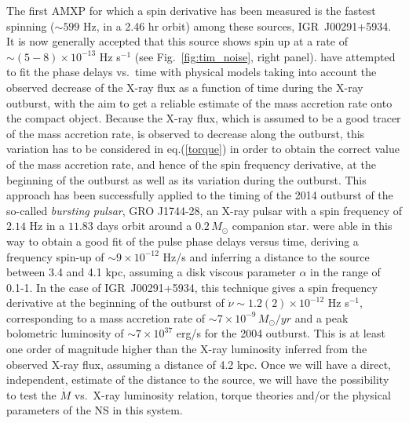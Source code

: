 \documentclass[graybox]{svmult}
\begin{document}
The first AMXP for which a spin derivative has been measured is the fastest spinning ($\sim 599$ Hz, in a 2.46 hr orbit) among these sources, IGR~J00291+5934. It is now generally accepted that this source shows spin up at a rate of $\sim (5-8) \times 10^{-13}$ Hz s$^{-1}$ \cite{Falanga2005b,Patruno2010,Hartman2011,Papitto2011c} (see Fig.~\ref{fig:tim_noise}, right panel). \cite{Burderi2007} have attempted to fit the phase delays vs.\ time with physical models taking into account the observed decrease of the X-ray flux as a function of time during the X-ray outburst, with the aim to get a reliable estimate of the mass accretion rate onto the compact object. 
Because the X-ray flux, which is assumed to be a good tracer of the mass accretion rate, is observed to decrease along the outburst, this variation has to be considered in eq.(\ref{torque}) in order to obtain the correct value of the mass accretion rate, and hence of the spin frequency derivative, at the beginning of the outburst as well as its variation during the outburst. This approach has been successfully applied to the timing of the 2014 outburst of the so-called {\it bursting pulsar}, GRO J1744-28, an X-ray pulsar with a spin frequency of $2.14$ Hz in a $11.83$ days orbit around a $0.2\, M_\odot$ companion star. \cite{Sanna2017b} were able in this way to obtain a good fit of the pulse phase delays versus time, deriving a frequency spin-up of $\sim 9 \times 10^{-12}$ Hz/s and inferring a distance to the source between 3.4 and 4.1 kpc, assuming a disk viscous parameter $\alpha$ in the range of 0.1-1.   
In the case of IGR~J00291+5934, this technique gives a spin frequency derivative at the beginning of the outburst of $\dot \nu \sim 1.2(2) \times 10^{-12}$ Hz s$^{-1}$, corresponding to a mass accretion rate of $\sim 7 \times 10^{-9}\, M_\odot/yr$ and a peak bolometric luminosity of $\sim 7 \times 10^{37}$ erg/s for the 2004 outburst. This is at least one order of magnitude higher than the X-ray luminosity inferred from the observed X-ray flux, assuming a distance of 4.2 kpc. Once we will have a direct, independent, estimate of the distance to the source, we will have the possibility to test the $\dot M$ vs.\ X-ray luminosity relation, torque theories and/or the physical parameters of the NS in this system. 
\end{document}

